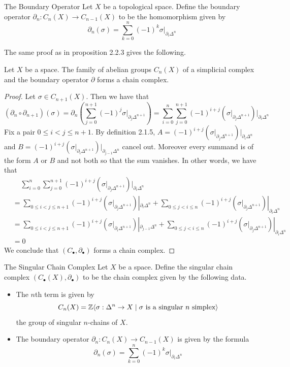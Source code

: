 \documentclass[a4paper]{article}
\begin{document}
\begin{defn}{The Boundary Operator}{} Let $X$ be a topological space. Define the boundary operator $\partial_n:C_n(X)\to C_{n-1}(X)$ to be the homomorphism given by $$\partial_n(\sigma)=\sum_{k=0}^n(-1)^k\sigma|_{\partial_i\Delta^n}$$
\end{defn}

The same proof as in proposition 2.2.3 gives the following. 

\begin{prp}{}{} Let $X$ be a space. The family of abelian groups $C_n(X)$ of a simplicial complex and the boundary operator $\partial$ forms a chain complex. \tcbline
\begin{proof}
Let $\sigma\in C_{n+1}(X)$. Then we have that $$(\partial_n\circ\partial_{n+1})(\sigma)=\partial_n\left(\sum_{j=0}^{n+1}(-1)^j\sigma|_{\partial_j\Delta^{n+1}}\right)=\sum_{i=0}^n\sum_{j=0}^{n+1}(-1)^{i+j}\left(\sigma|_{\partial_j\Delta^{n+1}}\right)|_{\partial_i\Delta^n}$$ Fix a pair $0\leq i<j\leq n+1$. By definition 2.1.5, $A=(-1)^{i+j}\left(\sigma|_{\partial_j\Delta^{n+1}}\right)|_{\partial_i\Delta^n}$ and $B=(-1)^{i+j}\left(\sigma|_{\partial_i\Delta^{n+1}}\right)|_{\partial_{j-1}\Delta^n}$ cancel out. Moreover every summand is of the form $A$ or $B$ and not both so that the sum vanishes. In other words, we have that 
\begin{align*}
&\;\;\;\;\sum_{i=0}^n\sum_{j=0}^{n+1}(-1)^{i+j}\left(\sigma|_{\partial_j\Delta^{n+1}}\right)|_{\partial_i\Delta^n}\\
&=\sum_{0\leq i<j\leq n+1}(-1)^{i+j}\left(\sigma|_{\partial_j\Delta^{n+1}}\right)|_{\partial_i\Delta^n}+\sum_{0\leq j<i\leq n}(-1)^{i+j}\left(\sigma|_{\partial_j\Delta^{n+1}}\right)|_{\partial_i\Delta^n}\\
&=\sum_{0\leq i<j\leq n+1}(-1)^{i+j}\left(\sigma|_{\partial_i\Delta^{n+1}}\right)|_{\partial_{j-1}\Delta^n}+\sum_{0\leq j<i\leq n}(-1)^{i+j}\left(\sigma|_{\partial_j\Delta^{n+1}}\right)|_{\partial_i\Delta^n}\\
&=0
\end{align*}
We conclude that $(C_\bullet,\partial_\bullet)$ forms a chain complex. 
\end{proof}
\end{prp}

\begin{defn}{The Singular Chain Complex}{} Let $X$ be a space. Define the singular chain complex $(C_\bullet(X),\partial_\bullet)$ to be the chain complex given by the following data. 
\begin{itemize}
\item The $n$th term is given by $$C_n(X)=\mathbb{Z}\langle\sigma:\Delta^n\to X\;|\;\sigma\text{ is a singular }n\text{ simplex}\rangle$$ the group of singular $n$-chains of $X$. 
\item The boundary operator $\partial_n:C_n(X)\to C_{n-1}(X)$ is given by the formula $$\partial_n(\sigma)=\sum_{k=0}^n(-1)^k\sigma|_{\partial_i\Delta^n}$$
\end{itemize}
\end{defn}
\end{document}
